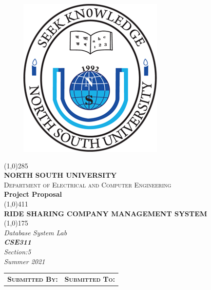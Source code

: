 \documentclass[12pt,a4paper]{article}
\begin{document}
\NoBgThispage

\begin{titlepage}

  
  \begin{figure}[h!]
    \centering
    \includegraphics[scale=0.78]{nsu.png}
  \end{figure}
  
 \begin{center}
 \vspace{-0.3cm}
 \line(1,0){285}\\
 \Large{\bfseries NORTH SOUTH UNIVERSITY}\\
 
 \textsc{\large Department of Electrical and Computer Engineering}\\
 \vspace{1.4cm}
 \Large{\bfseries Project Proposal}\\
 \vspace{-0.3cm}
 \line(1,0){411}\\
 \Large{\bfseries RIDE SHARING COMPANY MANAGEMENT SYSTEM}\\
 [-0.4cm]  
  \line(1,0){175}\\
  \vspace{0.3cm}
   {\large\emph{ Database System Lab}}\\
  {\Large  \emph{\textbf{CSE311}}}\\
  {\large  \emph{Section:5}}\\
  {\large \emph{Summer 2021}}\\
 
 \vspace{0.85cm}
\begin{tabular}{p{8.5cm} p{10cm}}
\textsc{ \normalsize \textbf{Submitted By:}} & \textsc{\normalsize \textbf{Submitted To:}}\\


\end{tabular}
\end{center}
\end{titlepage}
\end{document}
